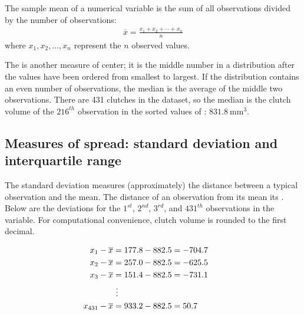 \begin{doublespace}
\begin{termBox}{%
		The sample mean of a numerical variable is the sum of all observations divided by the number of observations:
		\begin{eqnarray}
		\overline{x} = \frac{x_1+x_2+\cdots+x_n}{n}
		\label{meanEquation}
		\end{eqnarray}
		where $x_1, x_2, \dots, x_n$ represent the $n$ observed values.}
\end{termBox}

The  is another measure of center; it is the middle number in a distribution after the values have been ordered from smallest to largest. If the distribution contains an even number of observations, the median is the average of the middle two observations. There are 431 clutches in the dataset, so the median is the clutch volume of the $216^{th}$ observation in the sorted values of : $831.8\ \textrm{mm}^{3}$.




\subsection{Measures of spread: standard deviation and interquartile range}
\label{measuresOfSpread}


The standard deviation measures (approximately) the distance between a typical observation and the mean. The distance of an observation from its mean its . Below are the deviations for the $1^{st}$, $2^{nd}$, $3^{rd}$, and $431^{th}$ observations in the  variable. For computational convenience, clutch volume is rounded to the first decimal.

\begin{align*}
x_1-\overline{x} &= 177.8 - 882.5 = -704.7 \hspace{5mm}\text{ } \\
x_2-\overline{x} &= 257.0 - 882.5 = -625.5 \\
x_3-\overline{x} &= 151.4 - 882.5 = -731.1 \\
&\ \vdots \\
x_{431}-\overline{x} &= 933.2 - 882.5 = 50.7
\end{align*}


\end{doublespace}
